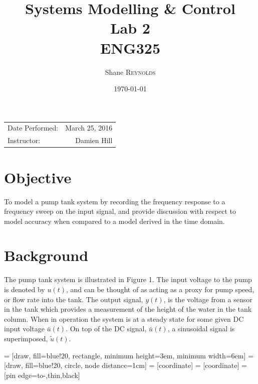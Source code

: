 \documentclass{article}
\title{Systems Modelling \& Control \\ Lab 2 \\ ENG325} %
\author{Shane \textsc{Reynolds}} %
\date{\today} %
\begin{document}
\maketitle %

\begin{center}
\begin{tabular}{l r}
Date Performed: & March 25, 2016 \\ %
Instructor: & Damien Hill %
\end{tabular}
\end{center}



\section{Objective}

To model a pump tank system by recording the frequency response to a frequency sweep on the input signal, and provide discussion with respect to model accuracy when compared to a model derived in the time domain.

\section{Background}

The pump tank system is illustrated in Figure 1. The input voltage to the pump is denoted by $u(t)$, and can be thought of as acting as a proxy for pump speed, or flow rate into the tank. The output signal, $y(t)$, is the voltage from a sensor in the tank which provides a measurement of the height of the water in the tank column. When in operation the system is at a steady state for some given DC input voltage $\bar{u}(t)$. On top of the DC signal, $\bar{u}(t)$, a sinusoidal signal is superimposed, $\tilde{u}(t)$.

 = [draw, fill=blue!20, rectangle, 
minimum height=3em, minimum width=6em]
 = [draw, fill=blue!20, circle, node distance=1cm]
 = [coordinate]
 = [coordinate]
 = [pin edge={to-,thin,black}]
\end{document}
